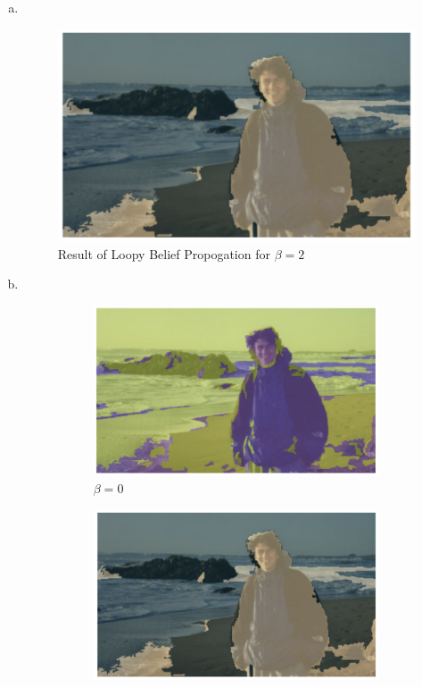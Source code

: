 \documentclass{article}
\begin{document}
\begin{enumerate}[(a)]
\begin{figure}[H]
\end{figure}
\item \textcolor{white}{{x}} 
\begin{figure}[H]
    \centering
    \includegraphics[scale=0.4]{beta2c.png}
    \caption{Result of Loopy Belief Propogation for $\beta = 2$}
\end{figure}
\item \textcolor{white}{{x}} 
\begin{figure}[H]
    \captionsetup[subfigure]{labelformat=empty}
    \centering
    \begin{subfigure}[b]{0.3\textwidth}
        \centering
        \includegraphics[width=\textwidth]{beta0.png}
        \caption{$\beta = 0$}
    \end{subfigure}
    \hfill
    \begin{subfigure}[b]{0.3\textwidth}
        \centering
        \includegraphics[width=\textwidth]{beta2c.png}

\end{subfigure}
\end{figure}
\end{enumerate}
\end{document}
